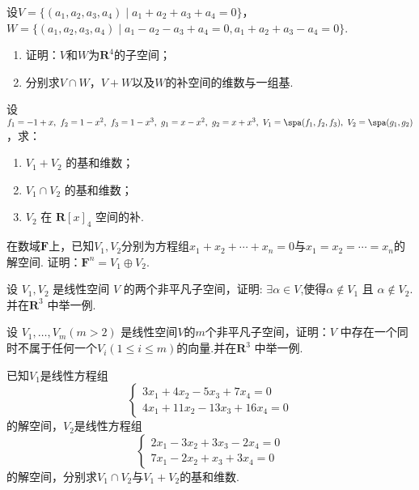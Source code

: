 \begin{exercise}

    \begin{exgroup}
        \item 设$V=\{(a_1,a_2,a_3,a_4) \mid a_1+a_2+a_3+a_4=0\}$，$W=\{(a_1,a_2,a_3,a_4) \mid a_1-a_2-a_3+a_4=0,a_1+a_2+a_3-a_4=0\}$.
        \begin{enumerate}
            \item 证明：$V$和$W$为$\mathbf{R}^4$的子空间；

            \item 分别求$V \cap W$，$V+W$以及$W$的补空间的维数与一组基.
        \end{enumerate}

        \item 设 $f_1=-1+x,\ f_2=1-x^2,\ f_3=1-x^3,\ g_1=x-x^2,\ g_2=x+x^3,\ V_1=\spa(f_1,f_2,f_3),\ V_2=\spa(g_1,g_2)$，求：
        \begin{enumerate}
            \item $V_1+V_2$ 的基和维数；

            \item $V_1 \cap V_2$ 的基和维数；

            \item $V_2$ 在 $\mathbf{R}[x]_4$ 空间的补.
        \end{enumerate}

        \item 在数域$\mathbf{F}$上，已知$V_1,V_2$分别为方程组$x_1+x_2+\cdots+x_n=0$与$x_1=x_2=\cdots=x_n$的解空间. 证明：$\mathbf{F}^n=V_1\oplus V_2$.

        \item 设 $V_1,V_2$ 是线性空间 $V$ 的两个非平凡子空间，证明: $\exists \alpha \in V$,使得$\alpha \notin V_1$ 且 $\alpha \notin V_2$.并在$\mathbf{R}^3$ 中举一例.

        \item 设 $V_1,\ldots,V_m (m > 2)$ 是线性空间$V$的$m$个非平凡子空间，证明：$V$ 中存在一个同时不属于任何一个$V_i(1 \leqslant i \leqslant m)$的向量.并在$\mathbf{R}^3$ 中举一例.
    \end{exgroup}

    \begin{exgroup}
        \item 已知$V_1$是线性方程组\[\begin{cases}
                3x_1+4x_2-5x_3+7x_4=0 \\
                4x_1+11x_2-13x_3+16x_4=0
            \end{cases}\]
        的解空间，$V_2$是线性方程组\[\begin{cases}
                2x_1-3x_2+3x_3-2x_4=0 \\
                7x_1-2x_2+x_3+3x_4=0
            \end{cases}\]
        的解空间，分别求$V_1 \cap V_2$与$V_1+V_2$的基和维数.


\end{exgroup}
\end{exercise}

